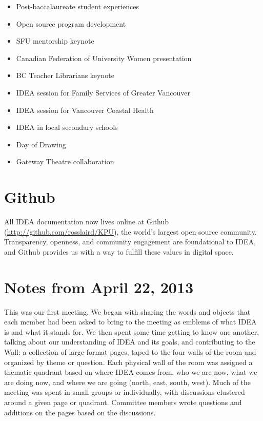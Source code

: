 \documentclass[letterpaper,10pt,headsepline]{scrreprt}
\begin{document}
\begin{itemize}
\itemsep1pt\parskip0pt
\item
  Post-baccalaureate student experiences
\item Open source program development
\item
  SFU mentorship keynote
\item
  Canadian Federation of University Women presentation
\item
  BC Teacher Librarians keynote
\item
  IDEA session for Family Services of Greater Vancouver
\item
  IDEA session for Vancouver Coastal Health
\item
  IDEA in local secondary schools
\item
  Day of Drawing
\item
  Gateway Theatre collaboration
\end{itemize}

\section{Github}

All IDEA documentation now lives online at Github (\url{http://github.com/rosslaird/KPU}), the world's largest open source community. Transparency, openness, and community engagement are foundational to IDEA, and Github provides us with a way to fulfill these values in digital space. 

\section{Notes from April 22, 2013}

This was our first meeting. We began with sharing the words and objects
that each member had been asked to bring to the meeting as emblems of
what IDEA is and what it stands for. We then spent some time getting to
know one another, talking about our understanding of IDEA and its goals,
and contributing to the Wall: a collection of large-format pages, taped
to the four walls of the room and organized by theme or question. Each
physical wall of the room was assigned a thematic quadrant based on
where IDEA comes from, who we are now, what we are doing now, and where
we are going (north, east, south, west). Much of the meeting was spent
in small groups or individually, with discussions clustered around a
given page or quadrant. Committee members wrote questions and additions
on the pages based on the discussions.
\end{document}
